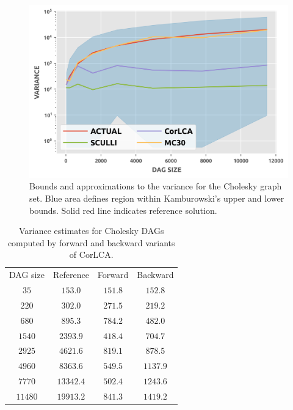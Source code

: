 \documentclass[12pt]{article}
\begin{document}
      \begin{figure}
	\centering	
	\includegraphics[scale=1.0]{chol_variance.png}
	\caption{Bounds and approximations to the variance for the Cholesky graph set. Blue area defines region within Kamburowski's upper and lower bounds. Solid red line indicates reference solution.}	
	\label{plot.variance_existing}
      \end{figure}

      \begin{table}
	\caption{Variance estimates for Cholesky DAGs computed by forward and backward variants of CorLCA.} 
        \begin{center}	
        	\begin{tabular}{c c c c}
                  \toprule
                  DAG size & Reference & Forward & Backward \\
                  \cmidrule{1-4}
                  $35$ & $153.0$ & $151.8$ & $152.8$\\
                  $220$ & $302.0$ & $271.5$ & $219.2$ \\
                  $680$ & $895.3$ & $784.2$ & $482.0$\\
                  $1540$ & $2393.9$ & $418.4$ & $704.7$ \\
                  $2925$ & $4621.6$ & $819.1$ & $878.5$ \\
                  $4960$ & $8363.6$ & $549.5$ & $1137.9$ \\
                  $7770$ & $13342.4$ & $502.4$ & $1243.6$ \\
                  $11480$ & $19913.2$ & $841.3$ & $1419.2$ \\
        	\bottomrule
        	\end{tabular}
        	\label{tb.corlca_direction}
        \end{center}	
      \end{table}
\end{document}
